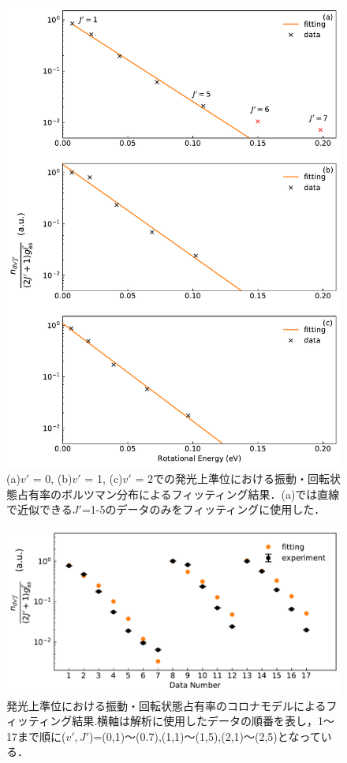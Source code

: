 \begin{figure}
    \centering
    \includegraphics[width=15cm]{pictures/upper-fitting.pdf}
    \caption[発光上準位における振動・回転状態占有率のボルツマン分布によるフィッティング結果($v'=0$)]{(a)$v'$ = 0, (b)$v'$ = 1, (c)$v'$ = 2での発光上準位における振動・回転状態占有率のボルツマン分布によるフィッティング結果．(a)では直線で近似できる$J'$=1-5のデータのみをフィッティングに使用した．}
    \label{fig:upper-fitting}
\end{figure}

\begin{figure}
    \centering
    \includegraphics[width=15cm]{pictures/fitting-result.pdf}
    \caption[発光上準位における振動・回転状態占有率のコロナモデルによるフィッティング結果]{発光上準位における振動・回転状態占有率のコロナモデルによるフィッティング結果.横軸は解析に使用したデータの順番を表し，1〜17まで順に($v',J'$)=(0,1)〜(0.7),(1,1)〜(1,5),(2,1)〜(2,5)となっている．}
    \label{fig:fitting-result}
\end{figure}

